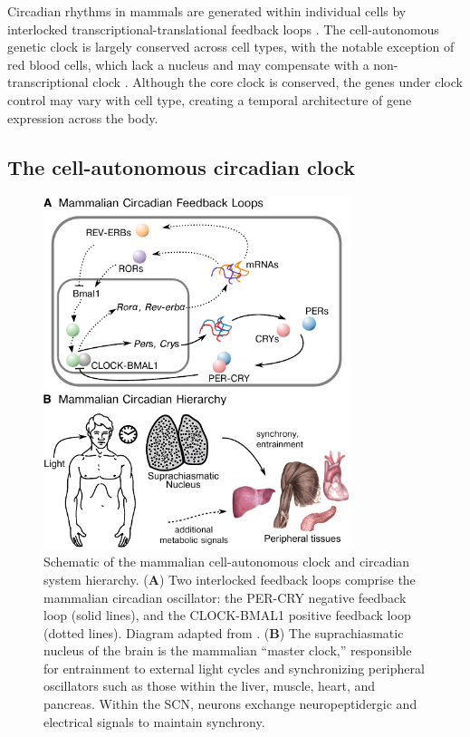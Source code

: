 Circadian rhythms in mammals are generated within individual cells by interlocked transcriptional-translational feedback loops \cite{Ko2006}.
The cell-autonomous genetic clock is largely conserved across cell types, with the notable exception of red blood cells, which lack a nucleus and may compensate with a non-transcriptional clock \cite{Neill2011}.
Although the core clock is conserved, the genes under clock control may vary with cell type, creating a temporal architecture of gene expression across the body.

\subsection*{The cell-autonomous circadian clock}

\begin{figure}[p] 
    \begin{center}
        \includegraphics[width=90mm]{chap1/figures/figure_1_clock_hierarchy.pdf}
    \end{center}
    \caption{Schematic of the mammalian cell-autonomous clock and circadian system hierarchy.
        (\textbf{A}) Two interlocked feedback loops comprise the mammalian circadian oscillator: the PER-CRY negative feedback loop (solid lines), and the CLOCK-BMAL1 positive feedback loop (dotted lines). Diagram adapted from \cite{Ko2006}. 
        (\textbf{B}) The suprachiasmatic nucleus of the brain is the mammalian ``master clock,'' responsible for entrainment to external light cycles and synchronizing peripheral oscillators such as those within the liver, muscle, heart, and pancreas.
        Within the SCN, neurons exchange neuropeptidergic and electrical signals to maintain synchrony.
   \label{fig:hierarchy} }
\end{figure}

